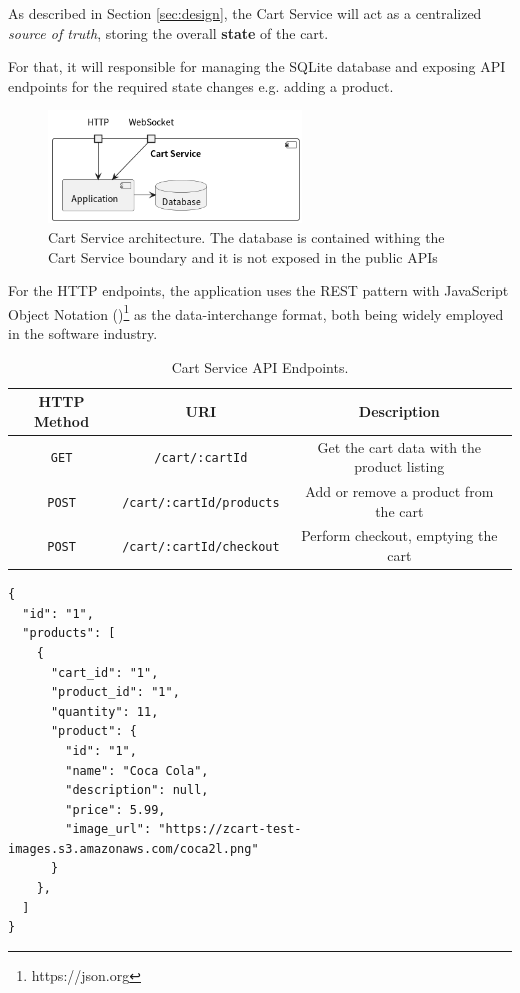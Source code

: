 \documentclass[openright]{normas-utf-tex} %
\begin{document}
As described in Section \ref{sec:design}, the Cart Service will act as a
centralized \textit{source of truth}, storing the overall \textbf{state} of the
cart.

For that, it will responsible for managing the SQLite database and exposing API
endpoints for the required state changes e.g. adding a product.

\begin{figure}[H]
	\centering
	\includegraphics[width=0.6\textwidth]{./images/diagrams/CartService.png}
    \caption[Cart Service architecture]{Cart Service architecture. The database
    is contained withing the Cart Service boundary and it is not exposed in the
    public APIs}
	\label{fig:dummy}
\end{figure}

For the HTTP endpoints, the application uses the REST \cite{Roy2000} pattern
with JavaScript Object Notation ()\footnote{https://json.org} as the data-interchange format, both
being widely employed in the software industry.

\begin{table}[H]
	\centering
	\label{tab:correlacao}
	\begin{tabular}{c | c|c}
		\hline 
        HTTP Method & URI & Description \\
		\hline
        \texttt{GET} & \texttt{/cart/:cartId} & Get the cart data with the product listing \\
        \texttt{POST} & \texttt{/cart/:cartId/products} & Add or remove a product from the cart \\
        \texttt{POST} & \texttt{/cart/:cartId/checkout} & Perform checkout, emptying the cart \\
		\hline 
	\end{tabular}
    \caption[Cart Service API endpoints]{Cart Service API Endpoints.}
\end{table}

\begin{lstlisting}[caption={Example response for the \texttt{GET /cart/:cartId} endpoint using JSON},label={lst:response}]
{
  "id": "1",
  "products": [
    {
      "cart_id": "1",
      "product_id": "1",
      "quantity": 11,
      "product": {
        "id": "1",
        "name": "Coca Cola",
        "description": null,
        "price": 5.99,
        "image_url": "https://zcart-test-images.s3.amazonaws.com/coca2l.png"
      }
    },
  ]
}
\end{lstlisting}
\end{document}
